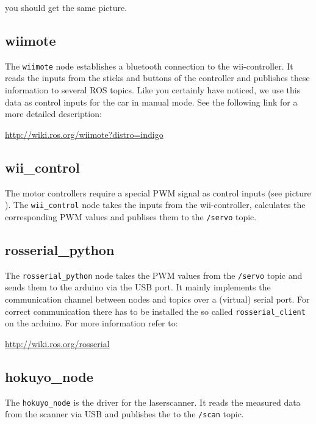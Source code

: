 
you should get the same picture.


\subsection{wiimote}
\label{sec:tas_package_drivers_wiimote}
The \texttt{wiimote} node establishes a bluetooth connection to the wii-controller. It reads the inputs from the sticks and buttons of the controller and publishes these information to several ROS topics. Like you certainly have noticed, we use this data as control inputs for the car in manual mode. See the following link for a more detailed description:

\hyperref[http://wiki.ros.org/wiimote?distro=indigo]{http://wiki.ros.org/wiimote?distro=indigo}

\subsection{wii\_control}
\label{sec:tas_package_drivers_wii_control}
The motor controllers require a special PWM signal as control inputs (see picture ). The \texttt{wii\_control} node takes the inputs from the wii-controller, calculates the corresponding PWM values and publises them to the \texttt{/servo} topic.


\subsection{rosserial\_python}
\label{sec:tas_package_drivers_rosserial}
The \texttt{rosserial\_python} node takes the PWM values from the \texttt{/servo} topic and sends them to the arduino via the USB port. It mainly implements the communication channel between nodes and topics over a (virtual) serial port. For correct communication there has to be installed the so called \texttt{rosserial\_client} on the arduino. For more information refer to:

\hyperref[http://wiki.ros.org/rosserial]{http://wiki.ros.org/rosserial}

\subsection{hokuyo\_node}
\label{sec:tas_package_drivers_hokuyo}
The \texttt{hokuyo\_node} is the driver for the laserscanner. It reads the measured data from the scanner via USB and publishes the to the \texttt{/scan} topic.


